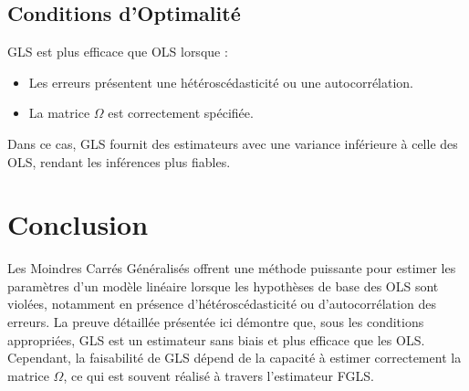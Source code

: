 \documentclass[14pt]{extarticle} %
\theoremstyle{definition}
\theoremstyle{plain}
\begin{document}
\subsection{Conditions d'Optimalité}

GLS est plus efficace que OLS lorsque :
\begin{itemize}
    \item Les erreurs présentent une hétéroscédasticité ou une autocorrélation.
    \item La matrice \( \Omega \) est correctement spécifiée.
\end{itemize}
Dans ce cas, GLS fournit des estimateurs avec une variance inférieure à celle des OLS, rendant les inférences plus fiables.

\section{Conclusion}

Les Moindres Carrés Généralisés offrent une méthode puissante pour estimer les paramètres d'un modèle linéaire lorsque les hypothèses de base des OLS sont violées, notamment en présence d'hétéroscédasticité ou d'autocorrélation des erreurs. La preuve détaillée présentée ici démontre que, sous les conditions appropriées, GLS est un estimateur sans biais et plus efficace que les OLS. Cependant, la faisabilité de GLS dépend de la capacité à estimer correctement la matrice \( \Omega \), ce qui est souvent réalisé à travers l'estimateur FGLS.
\end{document}
